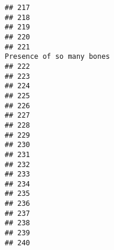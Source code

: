 \documentclass[
]{article}
\begin{document}
\begin{verbatim}
## 217                                                                                                        
## 218                                                                                                        
## 219                                                                                                        
## 220                                                                                                        
## 221                                                                               Presence of so many bones
## 222                                                                                                        
## 223                                                                                                        
## 224                                                                                                        
## 225                                                                                                        
## 226                                                                                                        
## 227                                                                                                        
## 228                                                                                                        
## 229                                                                                                        
## 230                                                                                                        
## 231                                                                                                        
## 232                                                                                                        
## 233                                                                                                        
## 234                                                                                                        
## 235                                                                                                        
## 236                                                                                                        
## 237                                                                                                        
## 238                                                                                                        
## 239                                                                                                        
## 240                                                                                                        

\end{verbatim}
\end{document}
